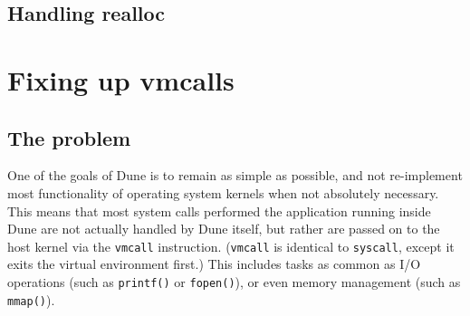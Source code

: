 \subsection{Handling realloc}

%
%

\section{Fixing up vmcalls}
\label{sec:vmcall-pointer-rewriting}

\subsection{The problem}

One of the goals of Dune is to remain as simple as possible, and not re-implement most functionality of operating system kernels when not absolutely necessary. This means that most system calls performed the application running inside Dune are not actually handled by Dune itself, but rather are passed on to the host kernel via the \lstinline!vmcall! instruction. (\lstinline!vmcall! is identical to \lstinline!syscall!, except it exits the virtual environment first.) This includes tasks as common as I/O operations (such as \lstinline!printf()! or \lstinline!fopen()!), or even memory management (such as \lstinline!mmap()!).

